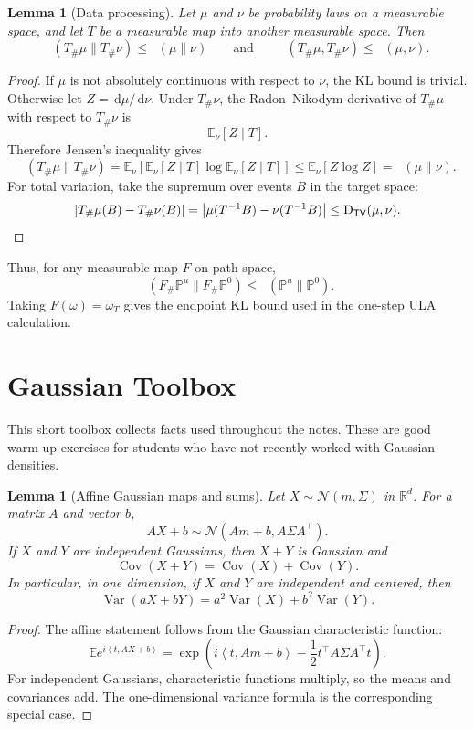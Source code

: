 \documentclass{amsart}
\numberwithin{equation}{section}
\theoremstyle{plain}
\newtheorem{lemma}[theorem]{Lemma}
\theoremstyle{definition}
\theoremstyle{remark}
\DeclareMathOperator{\KL}{D_{\mathsf{KL}}}
\DeclareMathOperator{\TV}{D_{\mathsf{TV}}}
\DeclareMathOperator{\Cov}{Cov}
\newcommand{\R}{\mathbb{R}}
\newcommand{\E}{\mathbb{E}}
\newcommand{\Pp}{\mathbb{P}}
\newcommand{\dd}{\,\mathrm{d}}
\newcommand{\abs}[1]{\left\lvert #1 \right\rvert}
\newcommand{\ip}[2]{\left\langle #1,#2 \right\rangle}
\newcommand{\normal}[2]{\mathcal{N}\!\left(#1,#2\right)}
\begin{document}
\begin{lemma}[Data processing]\label{lem:data-processing}
Let $\mu$ and $\nu$ be probability laws on a measurable space, and let
$T$ be a measurable map into another measurable space.  Then
\[
    \KL(T_\#\mu\|T_\#\nu)\leq \KL(\mu\|\nu)
    \qquad\text{and}\qquad
    \TV(T_\#\mu,T_\#\nu)\leq \TV(\mu,\nu).
\]
\end{lemma}

\begin{proof}
If $\mu$ is not absolutely continuous with respect to $\nu$, the KL bound is
trivial.  Otherwise let $Z=\dd\mu/\dd\nu$.  Under $T_\#\nu$, the
Radon--Nikodym derivative of $T_\#\mu$ with respect to $T_\#\nu$ is
\[
    \E_\nu[Z\mid T].
\]
Therefore Jensen's inequality gives
\[
    \KL(T_\#\mu\|T_\#\nu)
    =
    \E_\nu\!\left[\E_\nu[Z\mid T]\log \E_\nu[Z\mid T]\right]
    \leq
    \E_\nu[Z\log Z]
    =
    \KL(\mu\|\nu).
\]
For total variation, take the supremum over events $B$ in the target space:
\[
    \abs{T_\#\mu(B)-T_\#\nu(B)}
    =
    \abs{\mu(T^{-1}B)-\nu(T^{-1}B)}
    \leq
    \TV(\mu,\nu). \qedhere
\]
\end{proof}

Thus, for any measurable map $F$ on path space,
\[
    \KL(F_\#\Pp^u\|F_\#\Pp^0)\leq \KL(\Pp^u\|\Pp^0).
\]
Taking $F(\omega)=\omega_T$ gives the endpoint KL bound used in the
one-step ULA calculation.

\section{Gaussian Toolbox}\label{app:gaussian-toolbox}

This short toolbox collects facts used throughout the notes.  These are good
warm-up exercises for students who have not recently worked with Gaussian
densities.

\begin{lemma}[Affine Gaussian maps and sums]\label{lem:gaussian-affine-sum}
Let $X\sim\normal{m}{\Sigma}$ in $\R^d$.  For a matrix $A$ and vector $b$,
\[
    AX+b\sim\normal{Am+b}{A\Sigma A^\top}.
\]
If $X$ and $Y$ are independent Gaussians, then $X+Y$ is Gaussian and
\[
    \Cov(X+Y)=\Cov(X)+\Cov(Y).
\]
In particular, in one dimension, if $X$ and $Y$ are independent and centered,
then
\[
    \operatorname{Var}(aX+bY)
    =
    a^2\operatorname{Var}(X)+b^2\operatorname{Var}(Y).
\]
\end{lemma}

\begin{proof}
The affine statement follows from the Gaussian characteristic function:
\[
    \E e^{i\ip{t}{AX+b}}
    =
    \exp\!\left(i\ip{t}{Am+b}-\frac12 t^\top A\Sigma A^\top t\right).
\]
For independent Gaussians, characteristic functions multiply, so the means and
covariances add.  The one-dimensional variance formula is the corresponding
special case.
\end{proof}
\end{document}

